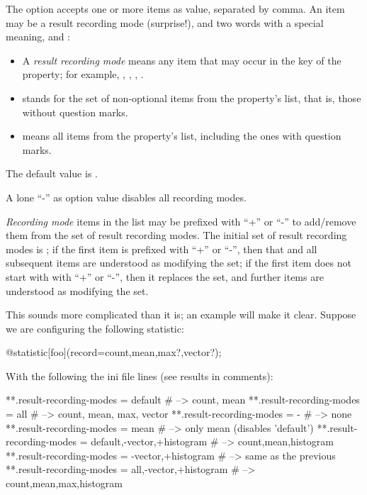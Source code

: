 The  option accepts one or more items as value,
separated by comma. An item may be a result recording mode (surprise!), and
two words with a special meaning,  and :

\begin{itemize}
\item A \textit{result recording mode} means any item that may occur in the
       key of the  property; for example,
      , , , .
\item {} stands for the set of non-optional items from
      the  property's  list, that is, those
      without question marks.
\item {} means all items from the  property's
       list, including the ones with question marks.
\end{itemize}

The default value is .

A lone ``-'' as option value disables all recording modes.

\textit{Recording mode} items in the list may be prefixed with ``+'' or
``-'' to add/remove them from the set of result recording modes. The
initial set of result recording modes is ; if the first item
is prefixed with ``+'' or ``-'', then that and all subsequent items are
understood as modifying the set; if the first item does not start with with
``+'' or ``-'', then it replaces the set, and further items are understood
as modifying the set.

This sounds more complicated than it is; an example will make it clear.
Suppose we are configuring the following statistic:

\begin{ned}
@statistic[foo](record=count,mean,max?,vector?);
\end{ned}

With the following the ini file lines (see results in comments):

\begin{inifile}
**.result-recording-modes = default  # --> count, mean
**.result-recording-modes = all      # --> count, mean, max, vector
**.result-recording-modes = -        # --> none
**.result-recording-modes = mean     # --> only mean (disables 'default')
**.result-recording-modes = default,-vector,+histogram # --> count,mean,histogram
**.result-recording-modes = -vector,+histogram         # --> same as the previous
**.result-recording-modes = all,-vector,+histogram  # --> count,mean,max,histogram
\end{inifile}

